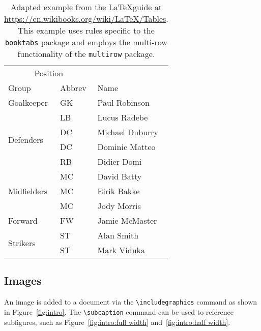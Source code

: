 \begin{table}[h] %
  \centering
  \begin{tabular}{lll}
    \toprule
    \multicolumn{2}{c}{Position} \\
    \cmidrule{1-2} %
    Group & Abbrev & Name \\
    \midrule
    Goalkeeper & GK & Paul Robinson \\
    \midrule
    \multirow{4}{*}{Defenders} & LB & Lucus Radebe \\
                               & DC & Michael Duburry \\
                               & DC & Dominic Matteo \\
                               & RB & Didier Domi \\
    \midrule
    \multirow{3}{*}{Midfielders} & MC & David Batty \\
                                 & MC & Eirik Bakke \\
                                 & MC & Jody Morris \\
    \midrule
    Forward & FW & Jamie McMaster \\
    \midrule
    \multirow{2}{*}{Strikers} & ST & Alan Smith \\
                              & ST & Mark Viduka \\
    \bottomrule
  \end{tabular}
  \caption{Adapted example from the \LaTeX guide at \url{https://en.wikibooks.org/wiki/LaTeX/Tables}. This example uses rules specific to the \texttt{booktabs} package and employs the multi-row functionality of the \texttt{multirow} package.}
  \label{tab:intro} %
\end{table}

\subsection{Images}

An image is added to a document via the \verb|\includegraphics| command as shown in Figure~\ref{fig:intro}.
The \verb|\subcaption| command can be used to reference subfigures, such as Figure~\ref{fig:intro:full width} and~\ref{fig:intro:half width}.

